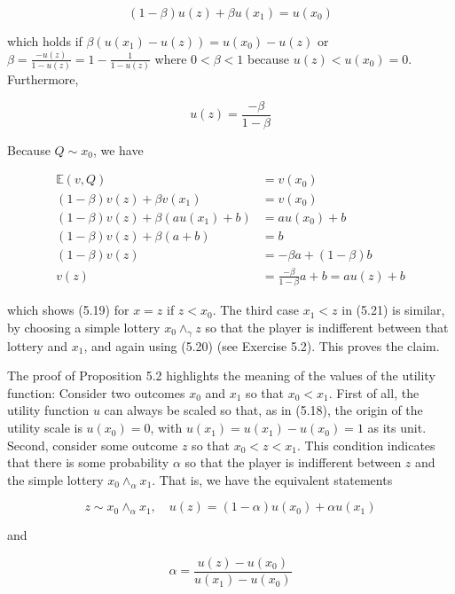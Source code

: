\documentclass[12pt]{article}
\begin{document}
$$
(1-\beta) u(z)+\beta u\left(x_{1}\right)=u\left(x_{0}\right)
$$

which holds if $\beta\left(u\left(x_{1}\right)-u(z)\right)=u\left(x_{0}\right)-u(z)$ or $\beta=\frac{-u(z)}{1-u(z)}=1-\frac{1}{1-u(z)}$ where $0<\beta<1$ because $u(z)<u\left(x_{0}\right)=0$. Furthermore,


\begin{equation*}
u(z)=\frac{-\beta}{1-\beta} \tag{5.22}
\end{equation*}


Because $Q \sim x_{0}$, we have


\begin{align*}
\mathbb{E}(v, Q) & =v\left(x_{0}\right) \\
(1-\beta) v(z)+\beta v\left(x_{1}\right) & =v\left(x_{0}\right) \\
(1-\beta) v(z)+\beta\left(a u\left(x_{1}\right)+b\right) & =a u\left(x_{0}\right)+b \\
(1-\beta) v(z)+\beta(a+b) & =b \\
(1-\beta) v(z) & =-\beta a+(1-\beta) b \\
v(z) & =\frac{-\beta}{1-\beta} a+b=a u(z)+b \tag{5.23}
\end{align*}


which shows (5.19) for $x=z$ if $z<x_{0}$. The third case $x_{1}<z$ in (5.21) is similar, by choosing a simple lottery $x_{0} \wedge_{\gamma} z$ so that the player is indifferent between that lottery and $x_{1}$, and again using (5.20) (see Exercise 5.2). This proves the claim.

The proof of Proposition 5.2 highlights the meaning of the values of the utility function: Consider two outcomes $x_{0}$ and $x_{1}$ so that $x_{0}<x_{1}$. First of all, the utility function $u$ can always be scaled so that, as in (5.18), the origin of the utility scale is $u\left(x_{0}\right)=0$, with $u\left(x_{1}\right)=u\left(x_{1}\right)-u\left(x_{0}\right)=1$ as its unit. Second, consider some outcome $z$ so that $x_{0}<z<x_{1}$. This condition indicates that there is some probability $\alpha$ so that the player is indifferent between $z$ and the simple lottery $x_{0} \wedge_{\alpha} x_{1}$. That is, we have the equivalent statements

$$
z \sim x_{0} \wedge_{\alpha} x_{1}, \quad u(z)=(1-\alpha) u\left(x_{0}\right)+\alpha u\left(x_{1}\right)
$$

and


\begin{equation*}
\alpha=\frac{u(z)-u\left(x_{0}\right)}{u\left(x_{1}\right)-u\left(x_{0}\right)} \tag{5.24}
\end{equation*}
\end{document}
